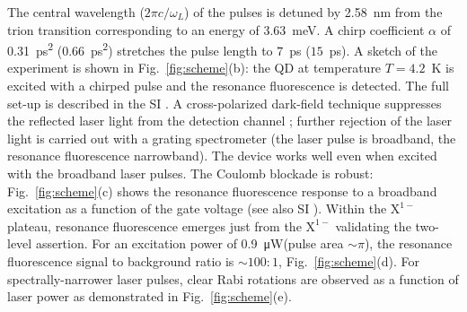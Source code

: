 \documentclass[aps,prl,reprint,superscriptaddress]{revtex4-1}
\begin{document}
The central wavelength ($2\pi c/\omega_L$) of the pulses is detuned by \SI{2.58}{\nano\meter} from the trion transition corresponding to an energy of \SI{3.63}{\milli\electronvolt}. A chirp coefficient $\alpha$ of \SI{0.31}{\pico\second\squared} (\SI{0.66}{\pico\second\squared}) stretches the pulse length to $7$~ps ($15$~ps). A sketch of the experiment is shown in Fig.~\ref{fig:scheme}(b): the QD at temperature $T=4.2$~K is excited with a chirped pulse and the resonance fluorescence is detected. The full set-up is described in the SI \cite{SI}. A cross-polarized dark-field technique suppresses the reflected laser light from the detection channel \cite{Vamivakas2009,Ylmaz2010,Kuhlmann2013_RSI,Kuhlmann2013_NatPhys}; further rejection of the laser light is carried out with a grating spectrometer (the laser pulse is broadband, the resonance fluorescence narrowband). The device works well even when excited with the broadband laser pulses. The Coulomb blockade is robust: Fig.~\ref{fig:scheme}(c) shows the resonance fluorescence response to a broadband excitation as a function of the gate voltage (see also SI \cite{SI}). Within the $\mathrm{X}^{1-}$ plateau, resonance fluorescence emerges just from the $\mathrm{X}^{1-}$ validating the two-level assertion. For an excitation power of \SI{0.9}{\micro\watt}(pulse area $\sim\pi$), the resonance fluorescence signal to background ratio is $\sim 100:1$, Fig.~\ref{fig:scheme}(d). For spectrally-narrower laser pulses, clear Rabi rotations are observed as a function of laser power as demonstrated in Fig.~\ref{fig:scheme}(e).
\end{document}
